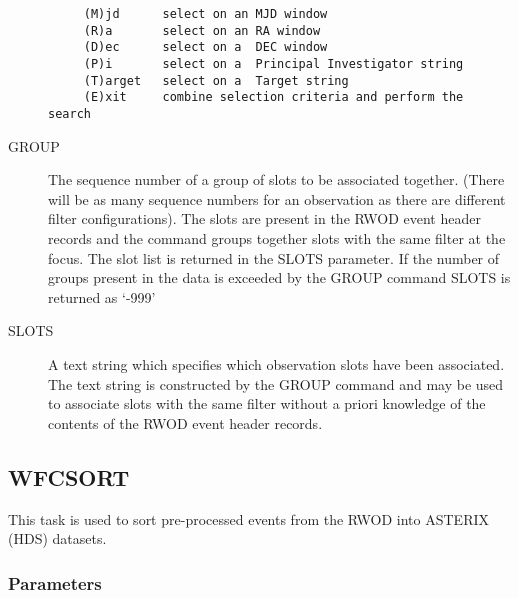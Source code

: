 \begin{description}
\begin{verbatim}
     (M)jd      select on an MJD window
     (R)a       select on an RA window
     (D)ec      select on a  DEC window
     (P)i       select on a  Principal Investigator string
     (T)arget   select on a  Target string
     (E)xit     combine selection criteria and perform the search
\end{verbatim}

\item[GROUP  ]
The sequence number of a group of slots to be associated together.
(There will be as many sequence numbers for an observation as there are
different filter configurations). The slots are present in the RWOD
event header records and the command groups together slots with the
same filter at the focus. The slot list is returned in the SLOTS
parameter. If the number of groups present in the data is exceeded by
the GROUP command SLOTS is returned as `-999'

\item[SLOTS  ]
A text string which specifies which observation slots have been
associated. The text string is constructed by the GROUP command and may
be used to associate slots with the same filter without a priori
knowledge of the contents of the RWOD event header records.

\end{description}

\subsection{WFCSORT}
\label{sec:programs:wfcsort}

This task is used to sort pre-processed events from the RWOD into
ASTERIX (HDS) datasets.

\subsubsection{Parameters}

